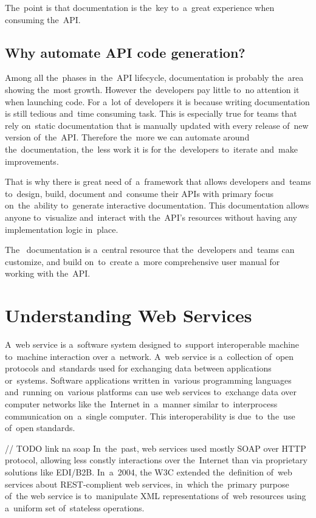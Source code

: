The~point is that documentation is the~key to~a~great experience when consuming
the~API.


\subsection{Why automate API code generation?}
Among all the~phases in~the~API lifecycle, documentation is probably the~area
showing the~most growth. However the~developers pay little to~no attention it
when launching code. For a~lot of~developers it is because writing documentation
is still tedious and~time consuming task. This is especially true for teams that
rely on~static documentation that is manually updated with every release of~new
version of~the~API. Therefore the~more we can automate around the~documentation,
the~less work it is for the~developers to~iterate and~make improvements.

That is why there is great need of~a~framework that allows developers and~teams
to~design, build, document and~consume their APIs with primary focus
on~the~ability to~generate interactive documentation. This documentation allows
anyone to~visualize and~interact with the~API's resources without having any
implementation logic in~place.

The~ documentation is a~central resource that the~developers
and~teams can customize, and build on~to~create a~more comprehensive user manual
for working with the~API.

\section{Understanding Web Services}
A~web service is a~software system designed to~support interoperable machine
to~machine interaction over a~network.
A~web service is a~collection of~open protocols and~standards used for
exchanging data between applications or~systems. Software
applications written in~various programming languages and~running on~various
platforms can use web services to~exchange data over computer networks like
the~Internet in~a~manner similar to~interprocess communication on~a~single
computer. This interoperability is due~to~the~use of~open standards. 

// TODO link na soap
In~the~past, web services used mostly SOAP over HTTP protocol, allowing less
constly interactions over the~Internet than via proprietary solutions like
EDI/B2B. In~a~2004, the W3C extended the~definition of~web services about
REST-complient web services, in~which the~primary purpose of~the web service is
to~manipulate XML representations of~web resources using a~uniform set
of~stateless operations.


